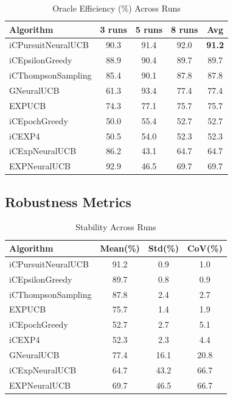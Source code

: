 \documentclass[12pt,a4paper]{article}
\newcommand{\primary}[1]{\textcolor{primaryblue}{\textbf{#1}}}
\begin{document}
\begin{tcolorbox}[colback=tableheader,colframe=primaryblue,title=\textbf{iCMAB Performance Matrix}]
\begin{table}[H]
\centering
\caption{Oracle Efficiency (\%) Across Runs}
\begin{tabular}{@{}lcccc@{}}
\toprule
Algorithm & 3 runs & 5 runs & 8 runs & Avg \\
\midrule
iCPursuitNeuralUCB & 90.3 & 91.4 & 92.0 & \primary{91.2} \\
iCEpsilonGreedy & 88.9 & 90.4 & 89.7 & 89.7 \\
iCThompsonSampling & 85.4 & 90.1 & 87.8 & 87.8 \\
GNeuralUCB & 61.3 & 93.4 & 77.4 & 77.4 \\
EXPUCB & 74.3 & 77.1 & 75.7 & 75.7 \\
iCEpochGreedy & 50.0 & 55.4 & 52.7 & 52.7 \\
iCEXP4 & 50.5 & 54.0 & 52.3 & 52.3 \\
iCExpNeuralUCB & 86.2 & 43.1 & 64.7 & 64.7 \\
EXPNeuralUCB & 92.9 & 46.5 & 69.7 & 69.7 \\
\bottomrule
\end{tabular}
\end{table}
\end{tcolorbox}

\subsection{Robustness Metrics}
\begin{table}[H]
\centering
\caption{Stability Across Runs}
\begin{tabular}{@{}lccc@{}}
\toprule
Algorithm & Mean(\%) & Std(\%) & CoV(\%) \\
\midrule
iCPursuitNeuralUCB & 91.2 & 0.9 & 1.0 \\
iCEpsilonGreedy & 89.7 & 0.8 & 0.9 \\
iCThompsonSampling & 87.8 & 2.4 & 2.7 \\
EXPUCB & 75.7 & 1.4 & 1.9 \\
iCEpochGreedy & 52.7 & 2.7 & 5.1 \\
iCEXP4 & 52.3 & 2.3 & 4.4 \\
GNeuralUCB & 77.4 & 16.1 & 20.8 \\
iCExpNeuralUCB & 64.7 & 43.2 & 66.7 \\
EXPNeuralUCB & 69.7 & 46.5 & 66.7 \\
\bottomrule
\end{tabular}
\end{table}
\end{document}
